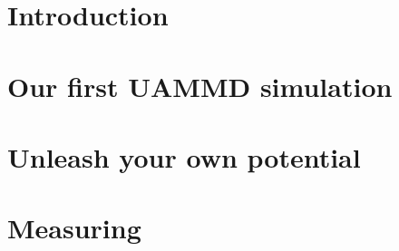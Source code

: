 \documentclass[a4paper,12pt,openany,hidelinks]{book}
\begin{document}

\tableofcontents

\chapter*{Introduction}



\chapter{Our first UAMMD simulation}



\chapter{Unleash your own potential}



\chapter{Measuring}

\end{document}
